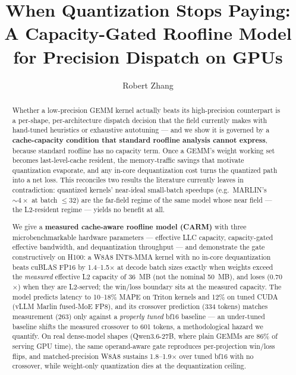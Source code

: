 \documentclass[10pt,twocolumn]{article}
\title{%
  \textbf{When Quantization Stops Paying:}\\
  \textbf{A Capacity-Gated Roofline Model for Precision Dispatch on GPUs}
}
\author[1]{Robert Zhang} %
\affil[1]{Purdue University} %
\affil[1]{\texttt{zhan4808@purdue.edu}} %
\date{}
\begin{document}
\maketitle

\begin{abstract}
Whether a low-precision GEMM kernel actually beats its high-precision counterpart is a per-shape, per-architecture dispatch decision that the field currently makes with hand-tuned heuristics or exhaustive autotuning --- and we show it is governed by a \textbf{cache-capacity condition that standard roofline analysis cannot express}, because standard roofline has no capacity term.  Once a GEMM's weight working set becomes last-level-cache resident, the memory-traffic savings that motivate quantization evaporate, and any in-core dequantization cost turns the quantized path into a net loss.  This reconciles two results the literature currently leaves in contradiction: quantized kernels' near-ideal small-batch speedups (e.g.\ MARLIN's ${\sim}4\times$ at batch $\leq$32) are the far-field regime of the same model whose near field --- the L2-resident regime --- yields no benefit at all.

We give a \textbf{measured cache-aware roofline model (CARM)} with three microbenchmarkable hardware parameters --- effective LLC capacity, capacity-gated effective bandwidth, and dequantization throughput --- and demonstrate the gate constructively on H100: a W8A8 INT8-MMA kernel with no in-core dequantization beats cuBLAS FP16 by 1.4--1.5$\times$ at decode batch sizes exactly when weights exceed the \emph{measured} effective L2 capacity of 36~MB (not the nominal 50~MB), and loses (0.70$\times$) when they are L2-served; the win/loss boundary sits at the measured capacity.  The model predicts latency to 10--18\% MAPE on Triton kernels and 12\% on tuned CUDA (vLLM Marlin fused-MoE FP8), and its crossover prediction (334 tokens) matches measurement (263) only against a \emph{properly tuned} bf16 baseline --- an under-tuned baseline shifts the measured crossover to 601 tokens, a methodological hazard we quantify.  On real dense-model shapes (Qwen3.6-27B, where plain GEMMs are 86\% of serving GPU time), the same operand-aware gate reproduces per-projection win/loss flips, and matched-precision W8A8 sustains 1.8--1.9$\times$ over tuned bf16 with no crossover, while weight-only quantization dies at the dequantization ceiling.


\end{abstract}
\end{document}
